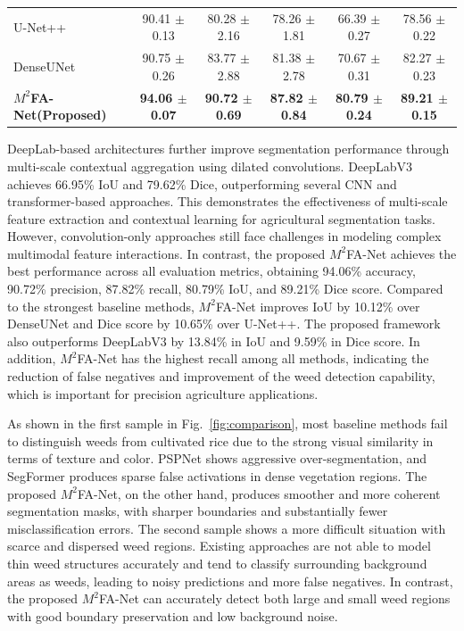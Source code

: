\documentclass[pdflatex,sn-mathphys-num]{sn-jnl}
\begin{document}
\begin{table}[t]
{\begin{tabular}{lccccc}
U-Net++ \cite{zhou2018unet++}
& 90.41 $\pm$ 0.13 
& 80.28 $\pm$ 2.16 
& 78.26 $\pm$ 1.81 
& 66.39 $\pm$ 0.27 
& 78.56 $\pm$ 0.22 \\

DenseUNet \cite{mu2023densenet}
& 90.75 $\pm$ 0.26
& 83.77 $\pm$ 2.88 
& 81.38 $\pm$ 2.78 
& 70.67 $\pm$ 0.31 
& 82.27 $\pm$ 0.23 \\

\textbf{$M^2$FA-Net(Proposed)}
& \textbf{94.06 $\pm$ 0.07} 
& \textbf{90.72 $\pm$ 0.69}
& \textbf{87.82 $\pm$ 0.84} 
& \textbf{80.79 $\pm$ 0.24} 
& \textbf{89.21 $\pm$ 0.15} \\

\hline
\end{tabular}
}
\end{table}



DeepLab-based architectures further improve segmentation performance through multi-scale contextual aggregation using dilated convolutions. DeepLabV3 achieves 66.95\% IoU and 79.62\% Dice, outperforming several CNN and transformer-based approaches. This demonstrates the effectiveness of multi-scale feature extraction and contextual learning for agricultural segmentation tasks. However, convolution-only approaches still face challenges in modeling complex multimodal feature interactions. 
In contrast, the proposed $M^2$FA-Net achieves the best performance across all evaluation metrics, obtaining 94.06\% accuracy, 90.72\% precision, 87.82\% recall, 80.79\% IoU, and 89.21\% Dice score. Compared to the strongest baseline methods, $M^2$FA-Net improves IoU by 10.12\% over DenseUNet and Dice score by 10.65\% over U-Net++. The proposed framework also outperforms DeepLabV3 by 13.84\% in IoU and 9.59\% in Dice score. In addition, $M^2$FA-Net has the highest recall among all methods, indicating the reduction of false negatives and improvement of the weed detection capability, which is important for precision agriculture applications.


As shown in the first sample in Fig.~\ref{fig:comparison}, most baseline methods fail to distinguish weeds from cultivated rice due to the strong visual similarity in terms of texture and color. PSPNet shows aggressive over-segmentation, and SegFormer produces sparse false activations in dense vegetation regions. The proposed $M^2$FA-Net, on the other hand, produces smoother and more coherent segmentation masks, with sharper boundaries and substantially fewer misclassification errors. The second sample shows a more difficult situation with scarce and dispersed weed regions. Existing approaches are not able to model thin weed structures accurately and tend to classify surrounding background areas as weeds, leading to noisy predictions and more false negatives. In contrast, the proposed $M^2$FA-Net can accurately detect both large and small weed regions with good boundary preservation and low background noise. 
\end{document}

